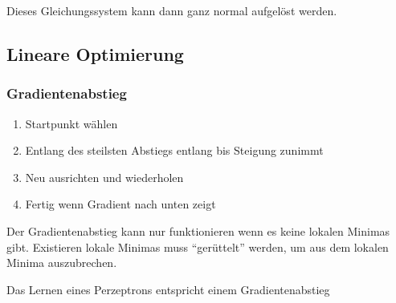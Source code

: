 Dieses Gleichungssystem kann dann ganz normal aufgelöst werden.

\subsection{Lineare Optimierung}
\subsubsection{Gradientenabstieg} \label{2_Gradientenabstieg}
\begin{enumerate}
	\item Startpunkt wählen
	\item Entlang des steilsten Abstiegs entlang bis Steigung zunimmt
	\item Neu ausrichten und wiederholen
	\item Fertig wenn Gradient nach unten zeigt
\end{enumerate}
Der Gradientenabstieg kann nur funktionieren wenn es keine lokalen
Minimas gibt. Existieren lokale Minimas muss ``gerüttelt'' werden, um
aus dem lokalen Minima auszubrechen.

Das Lernen eines Perzeptrons entspricht einem Gradientenabstieg

